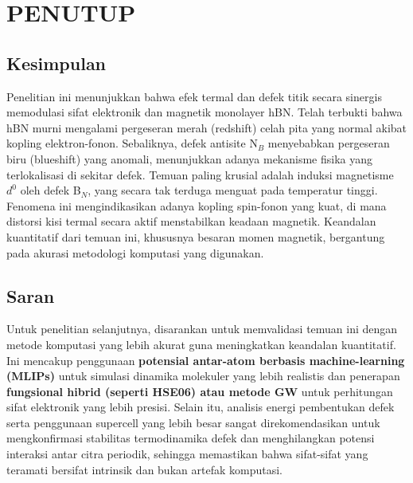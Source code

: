 \renewcommand{\thechapter}{\Roman{chapter}}
\chapter{PENUTUP}
\renewcommand{\thechapter}{\arabic{chapter}}

\section{Kesimpulan}
\label{sec:kesimpulan}
Penelitian ini menunjukkan bahwa efek termal dan defek titik secara sinergis memodulasi sifat elektronik dan magnetik monolayer hBN.
Telah terbukti bahwa hBN murni mengalami pergeseran merah (redshift) celah pita yang normal akibat kopling elektron-fonon.
Sebaliknya, defek antisite N$_B$ menyebabkan pergeseran biru (blueshift) yang anomali, menunjukkan adanya mekanisme fisika yang terlokalisasi di sekitar defek.
Temuan paling krusial adalah induksi magnetisme $d^0$ oleh defek B$_N$, yang secara tak terduga menguat pada temperatur tinggi.
Fenomena ini mengindikasikan adanya kopling spin-fonon yang kuat, di mana distorsi kisi termal secara aktif menstabilkan keadaan magnetik.
Keandalan kuantitatif dari temuan ini, khususnya besaran momen magnetik, bergantung pada akurasi metodologi komputasi yang digunakan.

\section{Saran}
\label{sec:saran}
Untuk penelitian selanjutnya, disarankan untuk memvalidasi temuan ini dengan metode komputasi yang lebih akurat guna meningkatkan keandalan kuantitatif.
Ini mencakup penggunaan \textbf{potensial antar-atom berbasis machine-learning (MLIPs)} untuk simulasi dinamika molekuler yang lebih realistis dan penerapan \textbf{fungsional hibrid (seperti HSE06) atau metode GW} untuk perhitungan sifat elektronik yang lebih presisi.
Selain itu, analisis energi pembentukan defek serta penggunaan supercell yang lebih besar sangat direkomendasikan untuk mengkonfirmasi stabilitas termodinamika defek dan menghilangkan potensi interaksi antar citra periodik, sehingga memastikan bahwa sifat-sifat yang teramati bersifat intrinsik dan bukan artefak komputasi.
